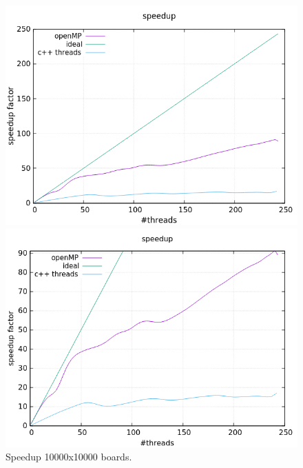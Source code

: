 \documentclass[a4paper,10pt]{article}
\begin{document}
\begin{figure}[H]
	\centering
	\begin{minipage}[t]{0.55\linewidth}
		\includegraphics[width=\linewidth]{10000_standard_speed.png}
	\end{minipage}%
	\begin{minipage}[t]{0.55\linewidth}
		\includegraphics[width=\linewidth]{10000_zoomed_speed.png}
	\end{minipage}
	\caption{Speedup 10000x10000 boards.}
	\label{10000Speed}
\end{figure}
\end{document}
